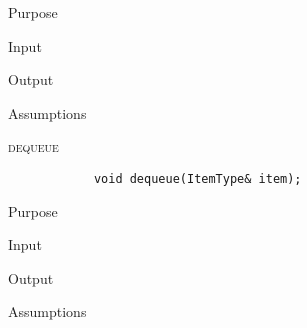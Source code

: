 \documentclass[pdftex, 12pt]{article}
\begin{document}
\begin{description}
\begin{description}
			\item{Purpose}

			\item{Input}

			\item{Output}

			\item{Assumptions}

		\end{description}
	\item{\textsc{dequeue}}
		\begin{lstlisting}
			void dequeue(ItemType& item);
		\end{lstlisting}
		\begin{description}

			\item{Purpose}

			\item{Input}

			\item{Output}

			\item{Assumptions}

		\end{description}
\end{description}
\end{document}

